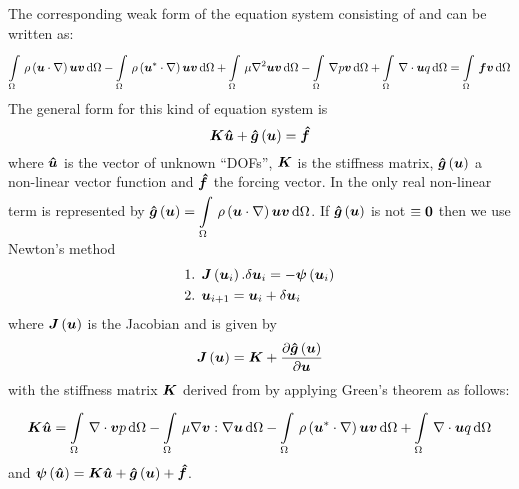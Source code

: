 The corresponding weak form of the equation system consisting of
 and 
can be written as:
\begin{equation}
  \gint{\Omega}{}{\rho\pbrac{\dotprod{\vectr{u}}{\grad}}\vectr{u}\vectr{v} }{\Omega}
  -\gint{\Omega}{}{\rho\pbrac{\dotprod{\vectr{u}^*}{\grad}}\vectr{u}\vectr{v} }{\Omega}
  +\gint{\Omega}{}{\mu\laplacian{}{\vectr{u}}\vectr{v}}{\Omega}
  -\gint{\Omega}{}{\gradient{}{p}\vectr{v}}{\Omega}
  +\gint{\Omega}{}{\divergence{}{\vectr{u}}q}{\Omega}=
  \gint{\Omega}{}{\vectr{f}\vectr{v}}{\Omega}  
  \label{eqn:NavierStokesweakform}
\end{equation}
The general form for this kind of equation system is
\begin{equation}
  \matr{K}{\vect{\hat{u}}}+
  \fnof{\vect{\hat{g}}}{{\vect{{u}}}}={\vect{\hat{f}}}
  \label{eqn:NavierStokesequationALE2general}
\end{equation}
where ${\vect{\hat{u}}}$ is the vector of unknown ``DOFs'', $\matr{K}$ is the
stiffness matrix, $\fnof{\vect{\hat{g}}}{{\vect{{u}}}}$ a non-linear vector
function and ${\vect{\hat{f}}}$ the forcing vector. In
 the only real non-linear term is represented
by
$\fnof{\vect{\hat{g}}}{\vect{{u}}}=\gint{\Omega}{}{\rho\pbrac{\dotprod{\vectr{u}}{\grad}}\vectr{u}\vectr{v}
}{\Omega}$.  If $\fnof{\vect{\hat{g}}}{\vect{u}}$ is not $\equiv\vect{0}$ then
we use Newton's method \ie
\begin{equation}
  \begin{split}
    \text{1.  } & \fnof{\matr{J}}{\vect{u}_{i}}.\delta
    \vect{u}_{i} = 
    -\fnof{\vect{\psi}}{\vectr{u}_{i}} \\
    \text{2.  } & \vect{u}_{i+1}=\vect{u}_{i}+\delta
    \vect{u}_{i}
  \end{split}
\end{equation}
where $\fnof{\matr{J}}{\vect{u}}$ is the Jacobian and is given by
\begin{equation}
  \fnof{\matr{J}}{\vect{u}}=\matr{K}+
    \delby{\fnof{\vect{\hat{g}}}{\vect{u}}}{\vect{u}}
\end{equation}
with the stiffness matrix $\matr{K}$ derived from
 by applying Green's theorem as
follows:
\begin{equation}
  \begin{split}
  \matr{K}\vectr{\hat{u}}=
  \gint{\Omega}{}{\divergence{}{\vectr{v}}p}{\Omega}
  -\gint{\Omega}{}{\doubledotprod{\mu\gradient{}{\vectr{v}}}{\gradient{}{\vectr{u}}}}{\Omega}
  -\gint{\Omega}{}{\rho\pbrac{\dotprod{\vectr{u}^*}{\grad}}\vectr{u}\vectr{v}}{\Omega}
  +\gint{\Omega}{}{\divergence{}{\vectr{u}}q}{\Omega}
  \end{split}
  \label{eqn:NavierStokesweakform2}
\end{equation}
and $\fnof{\vect{\psi}}{\vect{\hat{u}}}=\matr{K}\vect{\hat{u}}+\fnof{\vect{\hat{g}}}{\vect{u}}+\vect{\hat{f}}$.





